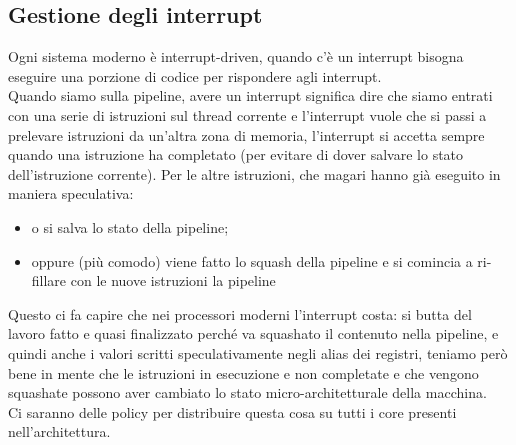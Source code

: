 \documentclass[14pt, oneside]{book}
\begin{document}
\subsection{Gestione degli interrupt}
Ogni sistema moderno è interrupt-driven, quando c'è un interrupt bisogna eseguire una porzione di codice per rispondere agli interrupt.\\ Quando siamo sulla pipeline, avere un interrupt significa dire che siamo entrati con una serie di istruzioni sul thread corrente e l'interrupt vuole che si passi a prelevare istruzioni da un'altra zona di memoria, l'interrupt si accetta sempre quando una istruzione ha completato (per evitare di dover salvare lo stato dell'istruzione corrente). Per le altre istruzioni, che magari hanno già eseguito in maniera speculativa: 
\begin{itemize}
\item o si salva lo stato della pipeline;
\item oppure (più comodo) viene fatto lo squash della pipeline e si comincia a ri-fillare con le nuove istruzioni la pipeline
\end{itemize}
Questo ci fa capire che nei processori moderni l'interrupt costa: si butta del lavoro fatto e quasi finalizzato perché va squashato il contenuto nella pipeline, e quindi anche i valori scritti speculativamente negli alias dei registri, teniamo però bene in mente che le istruzioni in esecuzione e non completate e che vengono squashate possono aver cambiato lo stato micro-architetturale della macchina.\\ Ci saranno delle policy per distribuire questa cosa su tutti i core presenti nell'architettura.
\end{document}
